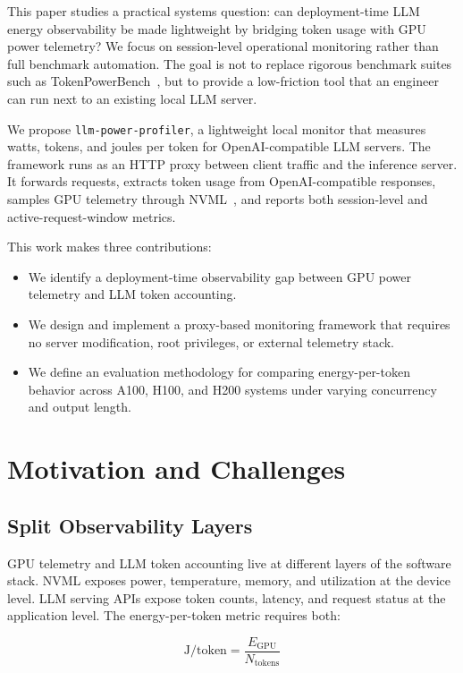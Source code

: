 \documentclass[conference]{IEEEtran}
\begin{document}
This paper studies a practical systems question: can deployment-time LLM energy observability be made lightweight by bridging token usage with GPU power telemetry? We focus on session-level operational monitoring rather than full benchmark automation. The goal is not to replace rigorous benchmark suites such as TokenPowerBench~\cite{tokenpowerbench}, but to provide a low-friction tool that an engineer can run next to an existing local LLM server.

We propose \texttt{llm-power-profiler}, a lightweight local monitor that measures watts, tokens, and joules per token for OpenAI-compatible LLM servers. The framework runs as an HTTP proxy between client traffic and the inference server. It forwards requests, extracts token usage from OpenAI-compatible responses, samples GPU telemetry through NVML~\cite{nvidia_nvml}, and reports both session-level and active-request-window metrics.

This work makes three contributions:

\begin{itemize}
    \item We identify a deployment-time observability gap between GPU power telemetry and LLM token accounting.
    \item We design and implement a proxy-based monitoring framework that requires no server modification, root privileges, or external telemetry stack.
    \item We define an evaluation methodology for comparing energy-per-token behavior across A100, H100, and H200 systems under varying concurrency and output length.
\end{itemize}

\section{Motivation and Challenges}

\subsection{Split Observability Layers}

GPU telemetry and LLM token accounting live at different layers of the software stack. NVML exposes power, temperature, memory, and utilization at the device level. LLM serving APIs expose token counts, latency, and request status at the application level. The energy-per-token metric requires both:

\begin{equation}
    \mathrm{J/token} = \frac{E_{\mathrm{GPU}}}{N_{\mathrm{tokens}}}
\end{equation}
\end{document}
